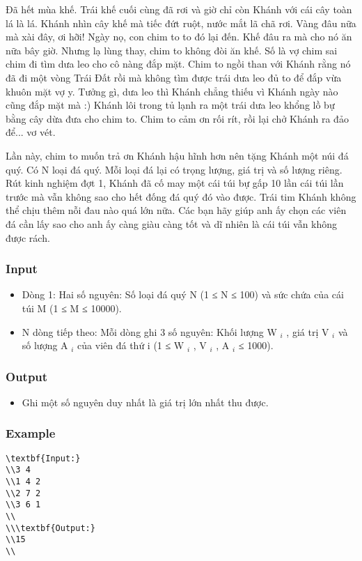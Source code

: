 



   Đã hết mùa khế. Trái khế cuối cùng đã rơi và giờ chỉ còn Khánh với cái cây toàn lá là lá. Khánh nhìn cây khế mà tiếc đứt ruột, nước mắt lã chã rơi. Vàng đâu nữa mà xài đây, ơi hỡi! Ngày nọ, con chim to to đó lại đến. Khế đâu ra mà cho nó ăn nữa bây giờ. Nhưng lạ lùng thay, chim to không đòi ăn khế. Số là vợ chim sai chim đi tìm dưa leo cho cô nàng đắp mặt. Chim to ngồi than với Khánh rằng nó đã đi một vòng Trái Đất rồi mà không tìm được trái dưa leo đủ to để đắp vừa khuôn mặt vợ y. Tưởng gì, dưa leo thì Khánh chẳng thiếu vì Khánh ngày nào cũng đắp mặt mà :) Khánh lôi trong tủ lạnh ra một trái dưa leo khổng lồ bự bằng cây dừa đưa cho chim to. Chim to cảm ơn rối rít, rồi lại chở Khánh ra đảo để... vơ vét.  

   Lần này, chim to muốn trả ơn Khánh hậu hĩnh hơn nên tặng Khánh một núi đá quý. Có N loại đá quý. Mỗi loại đá lại có trọng lượng, giá trị và số lượng riêng. Rút kinh nghiệm đợt 1, Khánh đã cố may một cái túi bự gấp 10 lần cái túi lần trước mà vẫn không sao cho hết đống đá quý đó vào được. Trái tim Khánh không thể chịu thêm nỗi đau nào quá lớn nữa. Các bạn hãy giúp anh ấy chọn các viên đá cần lấy sao cho anh ấy càng giàu càng tốt và dĩ nhiên là cái túi vẫn không được rách.  

\subsubsection{   Input  }
\begin{itemize}
	\item     Dòng 1: Hai số nguyên: Số loại đá quý N (1 ≤ N ≤ 100) và sức chứa của cái túi M (1 ≤ M ≤ 10000).   
	\item     N dòng tiếp theo: Mỗi dòng ghi 3 số nguyên: Khối lượng W    $_     i    $    , giá trị V    $_     i    $    và số lượng A    $_     i    $    của viên đá thứ i (1 ≤ W    $_     i    $    , V    $_     i    $    , A    $_     i    $    ≤ 1000).   
\end{itemize}

\subsubsection{   Output  }
\begin{itemize}
	\item     Ghi một số nguyên duy nhất là giá trị lớn nhất thu được.   
\end{itemize}

\subsubsection{   Example  }
\begin{verbatim}
\textbf{Input:}
\\3 4
\\1 4 2
\\2 7 2
\\3 6 1
\\
\\\textbf{Output:}
\\15
\\\end{verbatim}